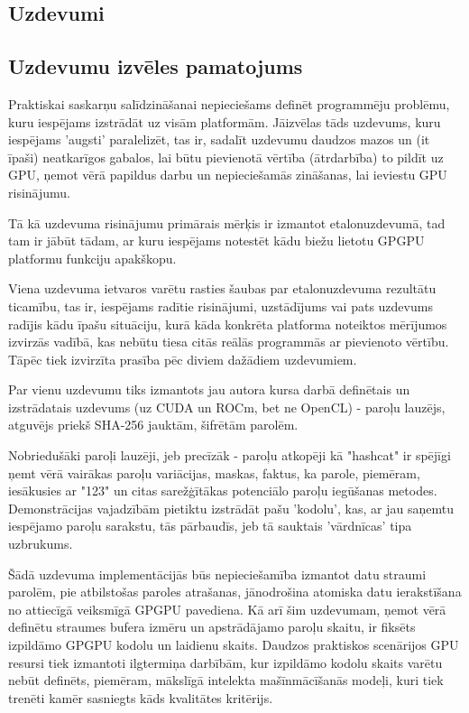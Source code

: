 \begin{center}
    \chapter{Uzdevumi}
\end{center}

\section{Uzdevumu izvēles pamatojums}

Praktiskai saskarņu salīdzināšanai nepieciešams definēt programmēju problēmu,
kuru iespējams izstrādāt uz visām platformām.  Jāizvēlas tāds uzdevums, kuru
iespējams 'augsti' paralelizēt, tas ir, sadalīt uzdevumu daudzos mazos un (it
īpaši) neatkarīgos gabalos, lai būtu pievienotā vērtība (ātrdarbība) to pildīt
uz GPU, ņemot vērā papildus darbu un nepieciešamās zināšanas, lai ieviestu GPU
risinājumu.

Tā kā uzdevuma risinājumu primārais mērķis ir izmantot etalonuzdevumā, tad
tam ir jābūt tādam, ar kuru iespējams notestēt kādu biežu lietotu GPGPU
platformu funkciju apakškopu.

Viena uzdevuma ietvaros varētu rasties šaubas par etalonuzdevuma rezultātu
ticamību, tas ir, iespējams radītie risinājumi, uzstādījums vai pats uzdevums
radījis kādu īpašu situāciju, kurā kāda konkrēta platforma noteiktos mērījumos
izvirzās vadībā, kas nebūtu tiesa citās reālās programmās ar pievienoto
vērtību. Tāpēc tiek izvirzīta prasība pēc diviem dažādiem uzdevumiem.

Par vienu uzdevumu tiks izmantots jau autora kursa darbā definētais un 
izstrādatais uzdevums (uz CUDA un ROCm, bet ne OpenCL) - paroļu lauzējs,
atguvējs priekš SHA-256 jauktām, šifrētām parolēm.\cite{kursa-darbs}

Nobriedušāki paroļi lauzēji, jeb precīzāk - paroļu atkopēji kā
"hashcat"\cite{hashcat} ir spējīgi ņemt vērā vairākas paroļu variācijas,
maskas, faktus, ka parole, piemēram, iesākusies ar "123" un citas sarežģītākas
potenciālo paroļu iegūšanas metodes. Demonstrācijas vajadzībām pietiktu
izstrādāt pašu 'kodolu', kas, ar jau saņemtu iespējamo paroļu sarakstu, tās
pārbaudīs, jeb tā sauktais 'vārdnīcas' tipa uzbrukums.\cite{hashcat_dict_atk}

Šādā uzdevuma implementācijās būs nepieciešamība izmantot datu straumi parolēm,
pie atbilstošas paroles atrašanas, jānodrošina atomiska datu ierakstīšana no
attiecīgā veiksmīgā GPGPU pavediena. Kā arī šim uzdevumam, ņemot vērā definētu
straumes bufera izmēru un apstrādājamo paroļu skaitu, ir fiksēts izpildāmo
GPGPU kodolu un laidienu skaits. Daudzos praktiskos scenārijos GPU resursi tiek
izmantoti ilgtermiņa darbībām, kur izpildāmo kodolu skaits varētu nebūt
definēts, piemēram, mākslīgā intelekta mašīnmācīšanās modeļi, kuri tiek trenēti
kamēr sasniegts kāds kvalitātes kritērijs.

